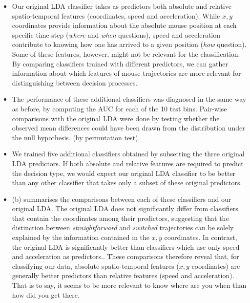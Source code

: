 \documentclass{article}
\newcommand{\nbMM}[1]{{\leavevmode\color{red}{\scriptsize#1}}}
\newcommand{\addMM}[1]{{\leavevmode\color{red}#1}}
\begin{document}
\begin{itemize}
\item Our original LDA classifier takes as predictors both absolute and relative spatio-temporal features (coordinates, speed and acceleration). 
While $x,y$ coordinates provide information about the absolute mouse position at each specific time step (\emph{where} and \emph{when} questions), speed and acceleration contribute to knowing how one has arrived to a given position (\emph{how} question). 
Some of these features, however, might not be relevant for the classification. 
By comparing classifiers trained with different predictors, we can gather information about which features of mouse trajectories are more relevant for distinguishing between decision processes. 

\item The performance of these additional classifiers was diagnosed in the same way as before, by computing the AUC for each of the 10 test bins. Pair-wise comparisons with the original LDA were done by testing whether the observed mean differences could have been drawn from the distribution under the null hypothesis. (by permutation test).

\item We trained five additional classifiers obtained by subsetting the three original LDA predictors. If both absolute and relative features are required to predict the decision type, we would expect our original LDA classifier to be better than any other classifier that takes only a subset of these original predictors. 

\item  {}(b) summarises the comparisons between each of these classifiers and our original LDA. 	
The original LDA does not significantly differ from classifiers that contain the coordinates among their predictors, suggesting that the distinction between \emph{straightforward} and \emph{switched} trajectories can be solely explained by the information contained in the $x,y$ coordinates. 
In contrast, the original LDA is significantly better than classifiers which use only speed and acceleration as predictors.\nbMM{Should we say something about the fact that the difference with the vel,acc and vel classifiers is significant but not particularly big?}. These comparisons therefore reveal that, for classifying our data, absolute spatio-temporal features ($x,y$ coordinates) are generally better predictors than relative features (speed and acceleration). \addMM{That is to say, it seems to be more relevant to know where are you when than how did you get there}.  


\end{itemize}
\end{document}
